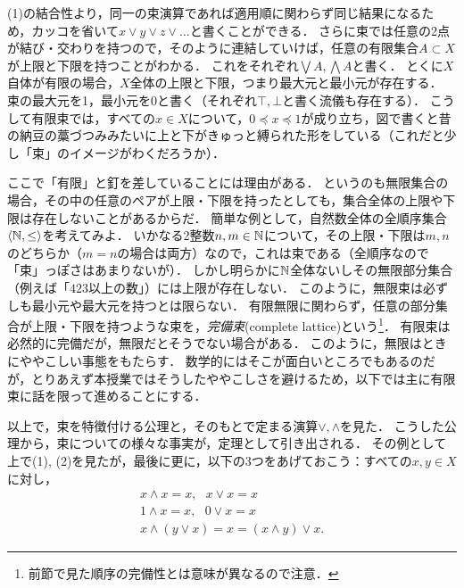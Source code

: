 \documentclass[11pt,a4paper]{jsarticle}
\begin{document}
(1)の結合性より，同一の束演算であれば適用順に関わらず同じ結果になるため，カッコを省いて$x \vee y \vee z \vee \dots$と書くことができる．
さらに束では任意の2点が結び・交わりを持つので，そのように連結していけば，任意の有限集合$A \subset X$が上限と下限を持つことがわかる．
これをそれぞれ$\bigvee A, \bigwedge A$と書く．
とくに$X$自体が有限の場合，$X$全体の上限と下限，つまり最大元と最小元が存在する．
束の最大元を1，最小元を0と書く（それぞれ$\top, \bot$と書く流儀も存在する）．
こうして有限束では，すべての$x \in X$について，$0 \preceq x \preceq 1$が成り立ち，図で書くと昔の納豆の藁づつみみたいに上と下がきゅっと縛られた形をしている（これだと少し「束」のイメージがわくだろうか）．

\begin{attn}
ここで「有限」と釘を差していることには理由がある．
というのも無限集合の場合，その中の任意のペアが上限・下限を持ったとしても，集合全体の上限や下限は存在しないことがあるからだ．
簡単な例として，自然数全体の全順序集合$\langle \mathbb{N}, \leq \rangle$を考えてみよ．
いかなる2整数$n, m \in \mathbb{N}$について，その上限・下限は$m,n$のどちらか（$m=n$の場合は両方）なので，これは束である（全順序なので「束」っぽさはあまりないが）．
しかし明らかに$\mathbb{N}$全体ないしその無限部分集合（例えば「$423$以上の数」）には上限が存在しない．
このように，無限束は必ずしも最小元や最大元を持つとは限らない．
有限無限に関わらず，任意の部分集合が上限・下限を持つような束を，\emph{完備束}(complete lattice)という\footnote{前節で見た順序の完備性とは意味が異なるので注意．}．
有限束は必然的に完備だが，無限だとそうでない場合がある．
このように，無限はときにややこしい事態をもたらす．
数学的にはそこが面白いところでもあるのだが，とりあえず本授業ではそうしたややこしさを避けるため，以下では主に有限束に話を限って進めることにする． 
\end{attn}

以上で，束を特徴付ける公理と，そのもとで定まる演算$\vee, \wedge$を見た．
こうした公理から，束についての様々な事実が，定理として引き出される．
その例として上で(1), (2)を見たが，最後に更に，以下の3つをあげておこう：すべての$x, y \in X$に対し，
\begin{align}
 x \wedge x = x, \ \ \ x \vee x = x \\
 1 \wedge x = x, \ \ \ 0 \vee x = x \\
 x \wedge (y \vee x) = x = (x \wedge y) \vee x .
\end{align}
\end{document}
